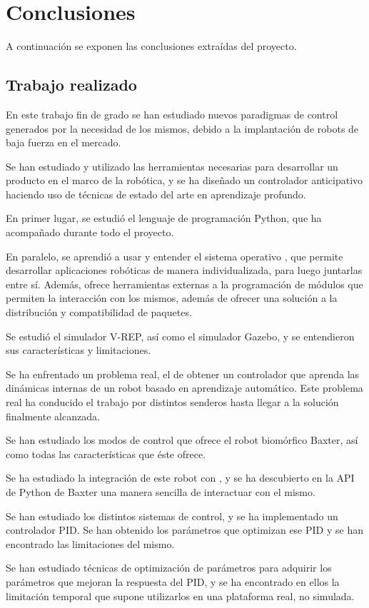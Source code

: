 \chapter{Conclusiones}
A continuación se exponen las conclusiones extraídas del proyecto.
\section{Trabajo realizado}
En este trabajo fin de grado se han estudiado nuevos paradigmas de control generados por la necesidad de los mismos, debido a la implantación de robots de baja fuerza en el mercado.

Se han estudiado y utilizado las herramientas necesarias para desarrollar un producto en el marco de la robótica, y se ha diseñado un controlador anticipativo haciendo uso de técnicas de estado del arte en aprendizaje profundo.

En primer lugar, se estudió el lenguaje de programación Python, que ha acompañado durante todo el proyecto.

En paralelo, se aprendió a usar y entender el sistema operativo \ros, que permite desarrollar aplicaciones robóticas de manera individualizada, para luego juntarlas entre sí. Además, ofrece herramientas externas a la programación de módulos que permiten la interacción con los mismos, además de ofrecer una solución a la distribución y compatibilidad de paquetes.

Se estudió el simulador V-REP, así como el simulador Gazebo, y se entendieron sus características y limitaciones.

Se ha enfrentado un problema real, el de obtener un controlador que aprenda las dinámicas internas de un robot basado en aprendizaje automático. Este problema real ha conducido el trabajo por distintos senderos hasta llegar a la solución finalmente alcanzada.

Se han estudiado los modos de control que ofrece el robot biomórfico Baxter, así como todas las características que éste ofrece.

Se ha estudiado la integración de este robot con \ros, y se ha descubierto en la API de Python de Baxter una manera sencilla de interactuar con el mismo.

Se han estudiado los distintos sistemas de control, y se ha implementado un controlador PID. Se han obtenido los parámetros que optimizan ese PID y se han encontrado las limitaciones del mismo.

Se han estudiado técnicas de optimización de parámetros para adquirir los parámetros que mejoran la respuesta del PID, y se ha encontrado en ellos la limitación temporal que supone utilizarlos en una plataforma real, no simulada.

